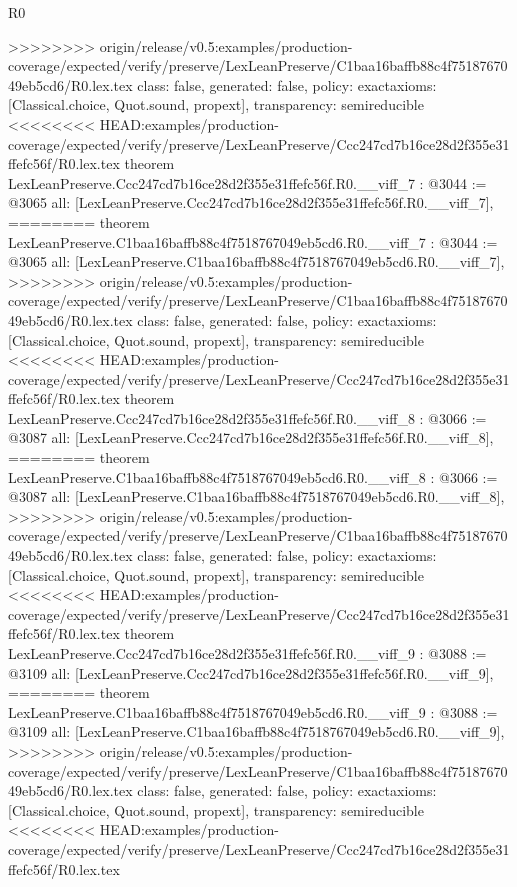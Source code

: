 \begin{lexlean}{R0}
\begin{coremodule}
{{{{{{{{{{{{{{{{{{{{{{{{{{{{{{{{{{{{{{{{{{{{{{{{{{{{{{{{{{{{{{{{>>>>>>>> origin/release/v0.5:examples/production-coverage/expected/verify/preserve/LexLeanPreserve/C1baa16baffb88c4f7518767049eb5cd6/R0.lex.tex
  class: false,
  generated: false,
  policy: exact{axioms: [Classical.choice, Quot.sound, propext]},
  transparency: semireducible
}
<<<<<<<< HEAD:examples/production-coverage/expected/verify/preserve/LexLeanPreserve/Ccc247cd7b16ce28d2f355e31ffefc56f/R0.lex.tex
theorem LexLeanPreserve.Ccc247cd7b16ce28d2f355e31ffefc56f.R0.__viff_7 : @3044 := @3065 {
  all: [LexLeanPreserve.Ccc247cd7b16ce28d2f355e31ffefc56f.R0.__viff_7],
========
theorem LexLeanPreserve.C1baa16baffb88c4f7518767049eb5cd6.R0.__viff_7 : @3044 := @3065 {
  all: [LexLeanPreserve.C1baa16baffb88c4f7518767049eb5cd6.R0.__viff_7],
>>>>>>>> origin/release/v0.5:examples/production-coverage/expected/verify/preserve/LexLeanPreserve/C1baa16baffb88c4f7518767049eb5cd6/R0.lex.tex
  class: false,
  generated: false,
  policy: exact{axioms: [Classical.choice, Quot.sound, propext]},
  transparency: semireducible
}
<<<<<<<< HEAD:examples/production-coverage/expected/verify/preserve/LexLeanPreserve/Ccc247cd7b16ce28d2f355e31ffefc56f/R0.lex.tex
theorem LexLeanPreserve.Ccc247cd7b16ce28d2f355e31ffefc56f.R0.__viff_8 : @3066 := @3087 {
  all: [LexLeanPreserve.Ccc247cd7b16ce28d2f355e31ffefc56f.R0.__viff_8],
========
theorem LexLeanPreserve.C1baa16baffb88c4f7518767049eb5cd6.R0.__viff_8 : @3066 := @3087 {
  all: [LexLeanPreserve.C1baa16baffb88c4f7518767049eb5cd6.R0.__viff_8],
>>>>>>>> origin/release/v0.5:examples/production-coverage/expected/verify/preserve/LexLeanPreserve/C1baa16baffb88c4f7518767049eb5cd6/R0.lex.tex
  class: false,
  generated: false,
  policy: exact{axioms: [Classical.choice, Quot.sound, propext]},
  transparency: semireducible
}
<<<<<<<< HEAD:examples/production-coverage/expected/verify/preserve/LexLeanPreserve/Ccc247cd7b16ce28d2f355e31ffefc56f/R0.lex.tex
theorem LexLeanPreserve.Ccc247cd7b16ce28d2f355e31ffefc56f.R0.__viff_9 : @3088 := @3109 {
  all: [LexLeanPreserve.Ccc247cd7b16ce28d2f355e31ffefc56f.R0.__viff_9],
========
theorem LexLeanPreserve.C1baa16baffb88c4f7518767049eb5cd6.R0.__viff_9 : @3088 := @3109 {
  all: [LexLeanPreserve.C1baa16baffb88c4f7518767049eb5cd6.R0.__viff_9],
>>>>>>>> origin/release/v0.5:examples/production-coverage/expected/verify/preserve/LexLeanPreserve/C1baa16baffb88c4f7518767049eb5cd6/R0.lex.tex
  class: false,
  generated: false,
  policy: exact{axioms: [Classical.choice, Quot.sound, propext]},
  transparency: semireducible
}
<<<<<<<< HEAD:examples/production-coverage/expected/verify/preserve/LexLeanPreserve/Ccc247cd7b16ce28d2f355e31ffefc56f/R0.lex.tex
}}}}}}}}}}}}}}}}}}}}}}}}}}}}}}}}}}}}}}}}}}}}}}}}}}}}}}}}}}}}}}}}}}
\end{coremodule}
\end{lexlean}
